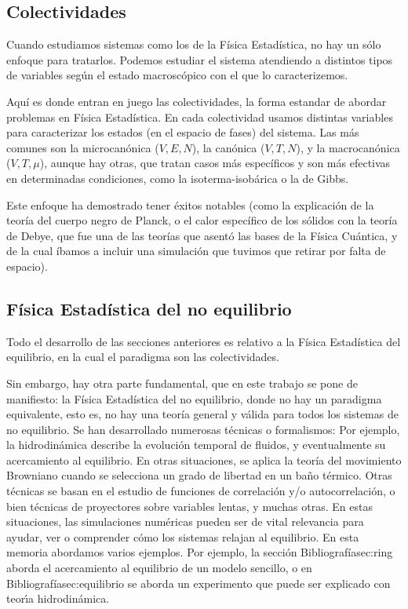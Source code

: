 \documentclass[11pt, a4paper]{article} %
\renewcommand\ref{Bibliografía}
\theoremstyle{named}
\begin{document}
\subsection{Colectividades}

Cuando estudiamos sistemas como los de la Física Estadística, no hay un sólo enfoque para tratarlos. Podemos estudiar el sistema atendiendo a distintos tipos de variables según el estado macroscópico con el que lo caracterizemos.

Aquí es donde entran en juego las colectividades, la forma estandar de abordar problemas en Física Estadística. En cada colectividad usamos distintas variables para caracterizar los estados (en el espacio de fases) del sistema. Las más comunes son la microcanónica ($ V, E, N$), la canónica ($V, T, N$), y la macrocanónica ($V, T, \mu$), aunque hay otras, que tratan casos más específicos y son más efectivas en determinadas condiciones, como la isoterma-isobárica o la de Gibbs.

Este enfoque ha demostrado tener éxitos notables (como la explicación de la teoría del cuerpo negro de Planck, o el calor específico de los sólidos con la teoría de Debye, que fue una de las teorías que asentó las bases de la Física Cuántica, y de la cual íbamos a incluir una simulación que tuvimos que retirar por falta de espacio).

\subsection{Física Estadística del no equilibrio}

Todo el desarrollo de las secciones anteriores es relativo a la Física Estadística del equilibrio, en la cual el paradigma son las colectividades.

Sin embargo, hay otra parte fundamental, que en este trabajo se pone de manifiesto: la Física Estadística del no equilibrio,  donde no hay un paradigma equivalente, esto es, no hay una teoría general y válida para todos los sistemas de no equilibrio. Se han desarrollado numerosas técnicas o formalismos: Por ejemplo, la hidrodinámica describe la evolución temporal de fluidos, y eventualmente su acercamiento al equilibrio. En otras situaciones, se aplica la teoría del  movimiento Browniano cuando se selecciona un grado de libertad en un baño térmico. Otras técnicas se basan en el estudio de funciones de correlación y/o autocorrelación, o bien técnicas de proyectores sobre variables lentas, y muchas otras. En estas situaciones, las simulaciones numéricas pueden ser de vital relevancia para ayudar, ver o comprender cómo los sistemas relajan al equilibrio. En esta memoria abordamos varios ejemplos. Por ejemplo,  la sección \ref{sec:ring} aborda el acercamiento al equilibrio de un modelo sencillo, o en \ref{sec:equilibrio} se aborda un experimento que puede ser explicado con teorı́a hidrodinámica.
\end{document}
